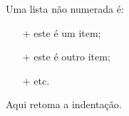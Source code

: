 Uma lista não numerada é:
\begin{itemize}
 \item[+] este é um item;
 \item[+] este é outro item;
 \item[+] etc.
\end{itemize}
Aqui retoma a indentação.
